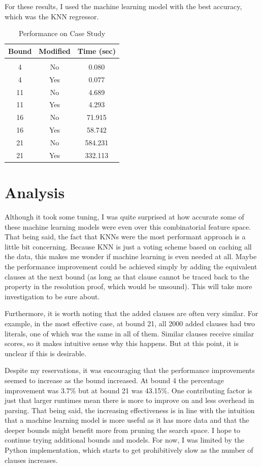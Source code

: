 \documentclass[letterpaper]{article} %
\begin{document}
For these results, I used the machine learning model with the best accuracy, which was the KNN regressor.

\begin{table}[h!]
\centering
\begin{tabular}{ c | c | c }
Bound & Modified & Time (sec) \\
\hline \\
4 & No & 0.080\\
4 & Yes & 0.077\\
11 & No & 4.689\\
11 & Yes & 4.293\\
16 & No & 71.915\\
16 & Yes & 58.742\\
21 & No & 584.231\\
21 & Yes & 332.113\\
\end{tabular}
\caption{Performance on Case Study}
\label{benchmark}
\end{table}

\section{Analysis}

Although it took some tuning, I was quite surprised at how accurate some of these machine learning models were even over this combinatorial feature space. That being said, the fact that KNNs were the most performant approach is a little bit concerning. Because KNN is just a voting scheme based on caching all the data, this makes me wonder if machine learning is even needed at all. Maybe the performance improvement could be achieved simply by adding the equivalent clauses at the next bound (as long as that clause cannot be traced back to the property in the resolution proof, which would be unsound). This will take more investigation to be sure about.

Furthermore, it is worth noting that the added clauses are often very similar. For example, in the most effective case, at bound 21, all 2000 added clauses had two literals, one of which was the same in all of them. Similar clauses receive similar scores, so it makes intuitive sense why this happens. But at this point, it is unclear if this is desirable.

Despite my reservations, it was encouraging that the performance improvements seemed to increase as the bound increased. At bound 4 the percentage improvement was 3.7\% but at bound 21 was 43.15\%. One contributing factor is just that larger runtimes mean there is more to improve on and less overhead in parsing. That being said, the increasing effectiveness is in line with the intuition that a machine learning model is more useful as it has more data and that the deeper bounds might benefit more from pruning the search space. I hope to continue trying additional bounds and models. For now, I was limited by the Python implementation, which starts to get prohibitively slow as the number of clauses increases.
\end{document}
